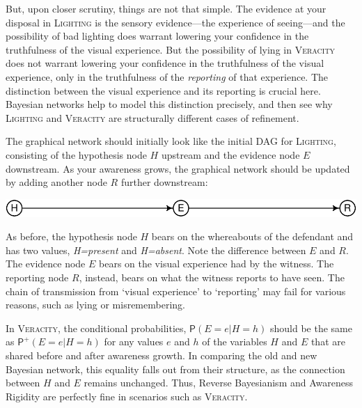 \documentclass[
  11pt,
  dvipsnames,enabledeprecatedfontcommands]{scrartcl}
\newcommand{\pr}[1]{\ensuremath{\mathsf{P}(#1)}}
\newcommand{\ppr}[2]{\ensuremath{\mathsf{P}^{#1}(#2)}}
\begin{document}
But, upon closer scrutiny, things are not that simple. The evidence at
your disposal in \textsc{Lighting} is the sensory evidence---the
experience of seeing---and the possibility of bad lighting does warrant
lowering your confidence in the truthfulness of the visual experience.
But the possibility of lying in \textsc{Veracity} does not warrant
lowering your confidence in the truthfulness of the visual experience,
only in the truthfulness of the \textit{reporting} of that experience.
The distinction between the visual experience and its reporting is
crucial here. Bayesian networks help to model this distinction
precisely, and then see why \textsc{Lighting} and \textsc{Veracity} are
structurally different cases of refinement.

The graphical network should initially look like the initial DAG for
\textsc{Lighting}, consisting of the hypothesis node \(H\) upstream and
the evidence node \(E\) downstream. As your awareness grows, the
graphical network should be updated by adding another node \(R\) further
downstream:

\begin{center}\includegraphics[width=0.5\linewidth,height=0.3\textheight]{ReplyToSteeleStefansson5_files/figure-latex/veracityDAG-1} \end{center}

\noindent As before, the hypothesis node \(H\) bears on the whereabouts
of the defendant and has two values, \textit{H=present} and
\textit{H=absent}. Note the difference between \(E\) and \(R\). The
evidence node \(E\) bears on the visual experience had by the witness.
The reporting node \(R\), instead, bears on what the witness reports to
have seen. The chain of transmission from `visual experience' to
`reporting' may fail for various reasons, such as lying or
misremembering.

In \textsc{Veracity}, the conditional probabilities,
\(\pr{E=e \vert H=h}\) should be the same as \(\ppr{+}{E=e \vert H=h}\)
for any values \(e\) and \(h\) of the variables \(H\) and \(E\) that are
shared before and after awareness growth. In comparing the old and new
Bayesian network, this equality falls out from their structure, as the
connection between \(H\) and \(E\) remains unchanged. Thus, Reverse
Bayesianism and Awareness Rigidity are perfectly fine in scenarios such
as \textsc{Veracity}.
\end{document}
